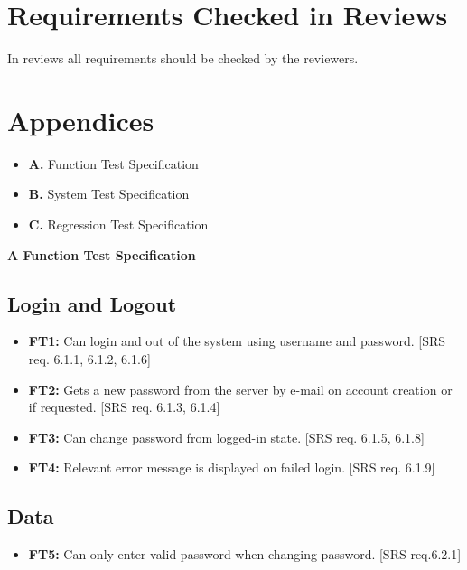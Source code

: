 \documentclass{article}
\begin{document}
\section{Requirements Checked in Reviews}
In reviews all requirements should be checked by the reviewers.

\section{Appendices}
	\begin{itemize}
		\item \textbf{A.} Function Test Specification 
		\item \textbf{B.} System Test Specification 	
		\item \textbf{C.} Regression Test Specification 
		\end{itemize}
	
	\newpage
		\begin{flushleft}
		{\large \textbf{A Function Test Specification}}
		\end{flushleft}
		
		\subsection{Login and Logout}
		
		\begin{itemize}
  			\item \textbf{FT1:} Can login and out of the system using username and password. [SRS req. 6.1.1, 6.1.2, 6.1.6]

  			\item \textbf{FT2:} Gets a new password from the server by e-mail on account creation or if requested. [SRS req. 6.1.3, 6.1.4]

  			\item \textbf{FT3:} Can change password from logged-in state. [SRS req. 6.1.5, 6.1.8]

  			\item \textbf{FT4:} Relevant error message is displayed on failed login. [SRS req. 6.1.9] 
		\end{itemize}
		
		\subsection{Data}
		
		\begin{itemize}
  			\item \textbf{FT5:} Can only enter valid password when changing password. [SRS req.6.2.1]

		\end{itemize}
		
\end{document}
